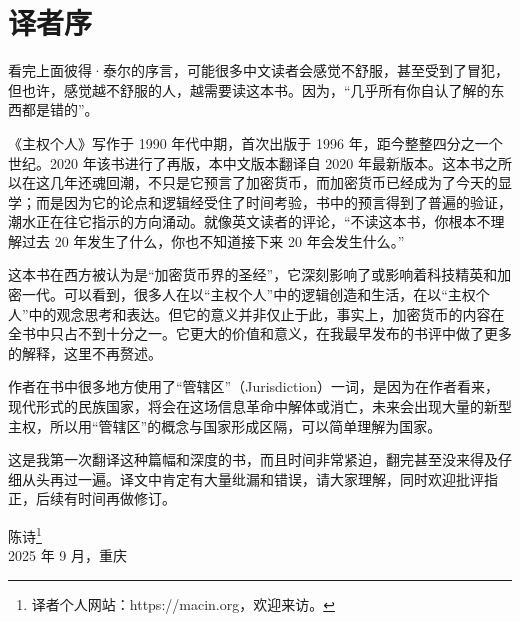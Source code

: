 \chapter{译者序}

看完上面彼得·泰尔的序言，可能很多中文读者会感觉不舒服，甚至受到了冒犯，但也许，感觉越不舒服的人，越需要读这本书。因为，“几乎所有你自认了解的东西都是错的”。


《主权个人》写作于 1990 年代中期，首次出版于 1996 年，距今整整四分之一个世纪。2020 年该书进行了再版，本中文版本翻译自 2020 年最新版本。这本书之所以在这几年还魂回潮，不只是它预言了加密货币，而加密货币已经成为了今天的显学；而是因为它的论点和逻辑经受住了时间考验，书中的预言得到了普遍的验证，潮水正在往它指示的方向涌动。就像英文读者的评论，“不读这本书，你根本不理解过去 20 年发生了什么，你也不知道接下来 20 年会发生什么。”

这本书在西方被认为是“加密货币界的圣经”，它深刻影响了或影响着科技精英和加密一代。可以看到，很多人在以“主权个人”中的逻辑创造和生活，在以“主权个人”中的观念思考和表达。但它的意义并非仅止于此，事实上，加密货币的内容在全书中只占不到十分之一。它更大的价值和意义，在我最早发布的书评中做了更多的解释，这里不再赘述。

作者在书中很多地方使用了“管辖区”（Jurisdiction）一词，是因为在作者看来，现代形式的民族国家，将会在这场信息革命中解体或消亡，未来会出现大量的新型主权，所以用“管辖区”的概念与国家形成区隔，可以简单理解为国家。

这是我第一次翻译这种篇幅和深度的书，而且时间非常紧迫，翻完甚至没来得及仔细从头再过一遍。译文中肯定有大量纰漏和错误，请大家理解，同时欢迎批评指正，后续有时间再做修订。

\begin{flushright}
\kaishu 陈诗\footnote{译者个人网站：https://macin.org，欢迎来访。} \\
2025 年 9 月，重庆
\end{flushright} 